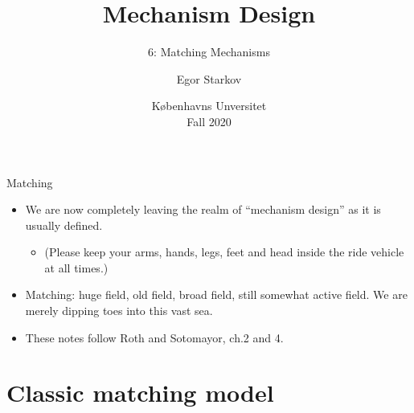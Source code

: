 \documentclass[english,10pt
,aspectratio=169
]{beamer}
\title{Mechanism Design}
\subtitle{6: Matching Mechanisms}
\author{Egor Starkov}
\date{K{\o}benhavns Unversitet \\
	Fall 2020}
\begin{document}
	\frame[plain]{\titlepage}


\begin{frame}{Matching}
\begin{itemize}
	\item We are now completely leaving the realm of ``mechanism design'' as it is usually defined.
	\begin{itemize}
		\item (Please keep your arms, hands, legs, feet and head inside the ride vehicle at all times.)
	\end{itemize}
	\item Matching: huge field, old field, broad field, still somewhat active field. We are merely dipping toes into this vast sea.
	\item These notes follow Roth and Sotomayor, ch.2 and 4.
\end{itemize}
\end{frame}


\section{Classic matching model}
\end{document}
